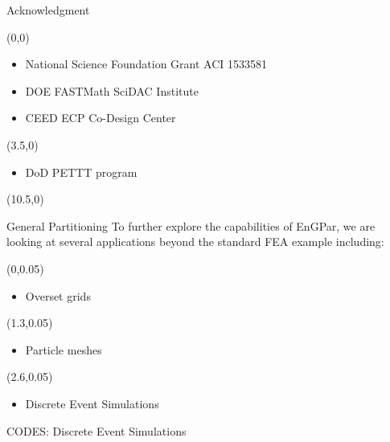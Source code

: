 \documentclass{beamer}
\begin{document}
\begin{textblock}{15.6}
\begin{textblock}{5.1}
    \begin{block}{\centering Acknowledgment}
      \begin{textblock}{3.5}(0,0)
      \begin{itemize}
      \item National Science Foundation Grant ACI 1533581
      \item DOE FASTMath SciDAC Institute
      \item CEED ECP Co-Design Center
      \end{itemize}
      \end{textblock}
      \begin{textblock}{1.5}(3.5,0)
        \begin{itemize}
          \item DoD PETTT program
        \end{itemize}
      \end{textblock}
      \vspace{4.2cm}
    \end{block}
  \end{textblock}
  \begin{textblock}{5.2}(10.5,0)
    \begin{block}{\centering General Partitioning}
      To further explore the capabilities of EnGPar, we are looking at several applications beyond the standard FEA example including:
      \begin{textblock}{2.5}(0,0.05)
        \begin{itemize}
        \item Overset grids 
        \end{itemize}
      \end{textblock}
      \begin{textblock}{2.5}(1.3,0.05)
        \begin{itemize}
        \item Particle meshes
        \end{itemize}
      \end{textblock}
      \begin{textblock}{2.5}(2.6,0.05)
        \begin{itemize}
        \item Discrete Event Simulations
        \end{itemize}
      \end{textblock}
      \vspace{1.6cm}
    \end{block}
    \begin{block}{\centering CODES: Discrete Event Simulations}

\end{block}
\end{textblock}
\end{textblock}
\end{document}
